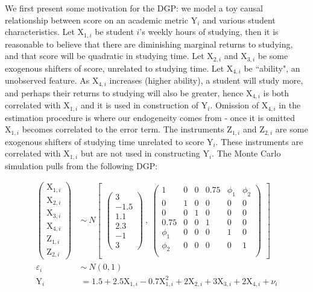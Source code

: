 \documentclass[12pt]{article}
\begin{document}
We first present some motivation for the DGP: we model a toy causal relationship between score on an academic metric $\mathrm{Y}_i$ and various student characteristics. Let $\mathrm{X}_{1, i}$ be student $i$'s weekly hours of studying, then it is reasonable to believe that there are diminishing marginal returns to studying, and that score will be quadratic in studying time. Let $\mathrm{X}_{2, i}$ and $\mathrm{X}_{3, i}$ be some exogenous shifters of score, unrelated to studying time. Let $\mathrm{X}_{4, i}$ be ``ability", an unobserved feature. As $\mathrm{X}_{4, i}$ increases (higher ability), a student will study more, and perhaps their returns to studying will also be greater, hence $\mathrm{X}_{4, i}$ is both correlated with $\mathrm{X}_{1, i}$ and it is used in construction of $\mathrm{Y}_{i}$. Omission of $\mathrm{X}_{4, i}$ in the estimation procedure is where our endogeneity comes from - once it is omitted $\mathrm{X}_{1, i}$ becomes correlated to the error term. The instruments $\mathrm{Z}_{1, i}$ and $\mathrm{Z}_{2, i}$ are some exogenous shifters of studying time unrelated to score $\mathrm{Y}_i$. These instruments are correlated with $\mathrm{X}_{1, i}$ but are not used in constructing $\mathrm{Y}_{i}$. The Monte Carlo simulation pulls from the following DGP:

$$
\begin{aligned}
\begin{pmatrix}
  \mathrm{X}_{1, i}\\
  \mathrm{X}_{2, i}\\
  \mathrm{X}_{3, i}\\
  \mathrm{X}_{4, i}\\
  \mathrm{Z}_{1, i}\\
  \mathrm{Z}_{2, i}
\end{pmatrix} \ &\sim \ N
\begin{bmatrix}
\begin{pmatrix}
  3\\
  -1.5\\
  1.1\\
  2.3\\
  -1\\
  3
\end{pmatrix} \ , \
\begin{pmatrix}
    1 & 0 & 0 & 0.75 & \phi_1 & \phi_2 \\
    0 & 1 & 0 & 0 & 0 & 0 \\
    0 & 0 & 1 & 0 & 0 & 0 \\
    0.75 & 0 & 0 & 1 & 0 & 0 \\
    \phi_1 & 0 & 0 & 0 & 1 & 0 \\
    \phi_2 & 0 & 0 & 0 & 0 & 1 \\
\end{pmatrix}
\end{bmatrix} \\
\varepsilon_i \ &\sim  \ N(0, 1) \\
\mathrm{Y}_i &= 1.5 + 2.5\mathrm{X}_{1, i} - 0.7\mathrm{X}_{1, i}^2 + 2\mathrm{X}_{2, i} + 3\mathrm{X}_{3, i} + 2\mathrm{X}_{4, i} +  \nu_i
\end{aligned}
$$
\end{document}
